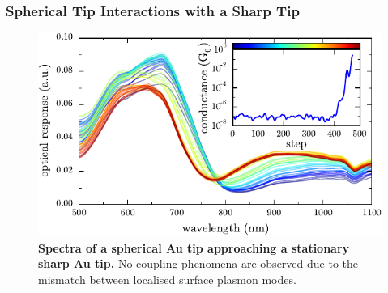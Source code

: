 \documentclass[a4paper]{article}
\begin{document}




\subsubsection{Spherical Tip Interactions with a Sharp Tip}

\begin{figure}[h]
\centering
\includegraphics{figures/sharp-AuNP_tip_dimer}
\caption[Spectra of a spherical Au tip approaching a stationary sharp Au tip]{\textbf{Spectra of a spherical Au tip approaching a stationary sharp Au tip.} No coupling phenomena are observed due to the mismatch between localised surface plasmon modes.}
\label{fig:spherical_sharp_tip_scan}
\end{figure}
\end{document}
